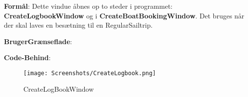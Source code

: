 \textbf{Formål}: Dette vindue åbnes op to steder i programmet: \textbf{CreateLogbookWindow} og i \textbf{CreateBoatBookingWindow}. Det bruges når der skal laves en besætning til en RegularSailtrip. 

\textbf{BrugerGrænseflade}:

\textbf{Code-Behind}:

\begin{wrapfigure}{r}{0.5\textwidth}
    \label{img:login_interface}
    \vspace{-20pt}
    \begin{center}
        \texttt{[image: Screenshots/CreateLogbook.png]}
    \end{center}
    \vspace{-15pt}
    \caption{CreateLogBookWindow}
\end{wrapfigure}